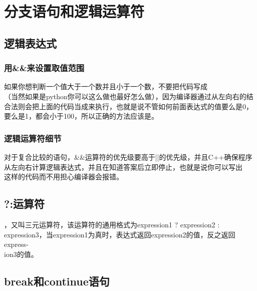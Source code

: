 
\chapter{分支语句和逻辑运算符}

\addtocounter{section}{1}

\section{逻辑表达式}

\addtocounter{subsection}{2}

\subsection{用\&\&来设置取值范围}

如果你想判断一个值大于一个数并且小于一个数，不要把代码写成\\ （当然如果是python你可以这么做也最好怎么做），因为编译器通过从左向右的结合法则会把上面的代码当成来执行，也就是说不管如何前面表达式的值要么是0，要么是1，都会小于100，所以正确的方法应该是。

\addtocounter{subsection}{2}

\subsection{逻辑运算符细节}

对于复合比较的语句，\&\&运算符的优先级要高于||的优先级，并且C++确保程序从左向右计算逻辑表达式，并且在知道答案后立即停止，也就是说你可以写出\\ 这样的代码而不用担心编译器会报错。

\addtocounter{section}{1}

\section{?:运算符}

，又叫三元运算符，该运算符的通用格式为expression1 ? expression2 : expression3，当expression1为真时，表达式返回expression2的值，反之返回express-\\ ion3的值。

\addtocounter{section}{1}

\section{break和continue语句}

